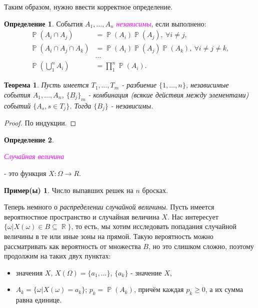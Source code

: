 \documentclass[a4paper,100pt]{article}
\theoremstyle{indented}
\newtheorem{theorem}{Теорема}
\theoremstyle{definition}
\newtheorem{defn}{Определение}
\newtheorem{exl}{Пример(ы)}
\theoremstyle{remark}
\DeclareMathOperator{\RR}{\mathbb{R}}
\DeclareMathOperator{\PP}{\mathbb{P}}
\begin{document}
Таким образом, нужно ввести корректное определение.

\begin{defn}
    События $A_1, \dots, A_n$ \hypertarget{n7}{\textcolor{magenta}{\textit{независимы}}}, если выполнено:
    \begin{align*}
        \PP(A_i\cap A_j)&=\PP(A_i)\PP(A_j), \: \forall i\neq j,  \\ 
        \PP(A_i\cap A_j\cap A_k)&=\PP(A_i)\PP(A_j)\PP(A_k), \: \forall i\neq j\neq k,  \\
        &\dots \\
        \PP(\bigcup_1^n A_i)&=\prod_1^n \PP(A_i).
    \end{align*}
\end{defn}

\begin{theorem}
    Пусть имеется $T_1, \ldots, T_m$ - разбиение $\{1, \ldots, n\}$, независимые события $A_1, \ldots, A_n$, $\{B_j\}_m$ - комбинация (всякие действия между элементами) событий $\{A_s, s\in T_j\}$. Тогда $\{B_j\}$ - независимы.
\end{theorem}

\begin{proof}
    По индукции.
\end{proof}

\begin{defn}
    \hypertarget{n8}{\textcolor{magenta}{\textit{Случайная величина}}} - это функция $X:\Omega\rightarrow R$. 
\end{defn}

\begin{exl}
    Число выпавших решек на $n$ бросках.
\end{exl}

Теперь немного о \textit{распределении случайной величины}. Пусть имеется вероятностное пространство и случайная величина $X$. Нас интересует $\{\omega\vert X(\omega)\in B\subseteq \RR \}$, то есть, мы хотим исследовать попадания случайной величины в те или иные зоны на прямой. Такую вероятность можно рассматривать как вероятность от множества $B$, но это слишком сложно, поэтому продолжим на таких двух пунктах:

\begin{itemize}
    \item значения $X$, $X(\Omega)=\{a_1, \ldots\}$, $\{a_k\}$ - значение $X$, 
    \item $A_k=\{\omega\vert X(\omega)=a_k\}$; $p_k=\PP(A_k)$, причём каждая $p_k\geq0$, а их сумма равна единице.
\end{itemize}
\end{document}
